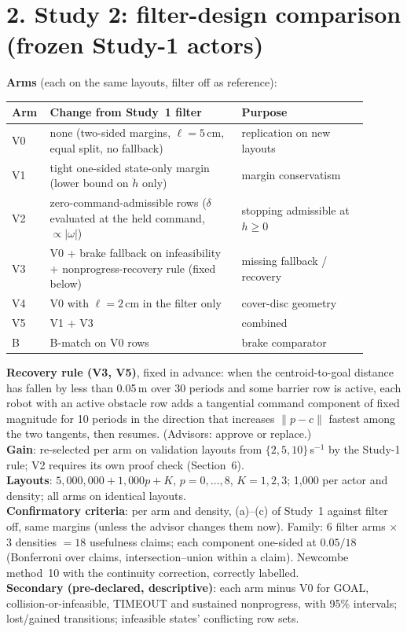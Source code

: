 \documentclass[10pt]{article}
\begin{document}
\section*{2. Study 2: filter-design comparison (frozen Study-1 actors)}
\textbf{Arms} (each on the same layouts, filter off as reference):
\begin{center}
\begin{tabular}{>{\raggedright}p{0.07\linewidth}>{\raggedright}p{0.5\linewidth}>{\raggedright\arraybackslash}p{0.33\linewidth}}
\toprule
Arm & Change from Study~1 filter & Purpose \\ \midrule
V0 & none (two-sided margins, $\ell=5$\,cm, equal split, no fallback) & replication on new layouts \\
V1 & tight one-sided state-only margin (lower bound on $\ddot h$ only) & margin conservatism \\
V2 & zero-command-admissible rows ($\delta$ evaluated at the held command, $\propto|\omega|$) & stopping admissible at $h\ge0$ \\
V3 & V0 + brake fallback on infeasibility + nonprogress-recovery rule (fixed below) & missing fallback / recovery \\
V4 & V0 with $\ell=2$\,cm in the filter only & cover-disc geometry \\
V5 & V1 + V3 & combined \\
B  & B-match on V0 rows & brake comparator \\
\bottomrule
\end{tabular}
\end{center}
\textbf{Recovery rule (V3, V5)}, fixed in advance: when the centroid-to-goal distance has fallen by less than 0.05\,m over 30 periods and some barrier row is active, each robot with an active obstacle row adds a tangential command component of fixed magnitude for 10 periods in the direction that increases $\|p-c\|$ fastest among the two tangents, then resumes. (Advisors: approve or replace.)\\
\textbf{Gain}: re-selected per arm on validation layouts from $\{2,5,10\}$\,s$^{-1}$ by the Study-1 rule; V2 requires its own proof check (Section~6).\\
\textbf{Layouts}: $5{,}000{,}000+1{,}000p+K$, $p=0,\dots,8$, $K=1,2,3$; 1{,}000 per actor and density; all arms on identical layouts.\\
\textbf{Confirmatory criteria}: per arm and density, (a)--(c) of Study~1 against filter off, same margins (unless the advisor changes them now). Family: 6 filter arms $\times$ 3 densities $=18$ usefulness claims; each component one-sided at $0.05/18$ (Bonferroni over claims, intersection--union within a claim). Newcombe method~10 with the continuity correction, correctly labelled.\\
\textbf{Secondary (pre-declared, descriptive)}: each arm minus V0 for GOAL, collision-or-infeasible, TIMEOUT and sustained nonprogress, with 95\% intervals; lost/gained transitions; infeasible states' conflicting row sets.
\end{document}
